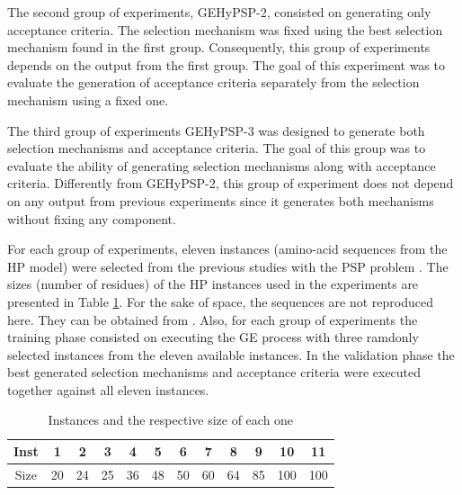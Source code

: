 \documentclass[conference]{IEEEtran}
\begin{document}
The second group of experiments, GEHyPSP-2, consisted on  generating only acceptance criteria. The selection mechanism was fixed using the best selection mechanism found in the first group. Consequently, this group of experiments depends on the output from the first group. The goal of this experiment was to evaluate the generation of acceptance criteria separately from the selection mechanism using a fixed one.



The third group of experiments GEHyPSP-3 was designed to  generate both selection mechanisms and acceptance criteria. The goal of this group was to evaluate the ability of generating selection mechanisms along with acceptance criteria. Differently from GEHyPSP-2, this group of experiment does not depend on any output from previous experiments since it generates both mechanisms without fixing any component.



For each group of experiments, eleven instances (amino-acid sequences from the HP model) were selected from the previous studies with the PSP problem \cite{custodio2004investigation,lin2011protein,santana2008component,custodio2014multiple}. The sizes (number of residues) of the HP instances used in the experiments are presented in Table \ref{tab:instances}. 
 For the sake of space, the sequences are not reproduced here. They can be obtained from \cite{santana2008component}. Also, for each group of experiments the training phase consisted on executing the GE process with three ramdonly selected instances from the eleven available instances. In the validation phase the best generated selection mechanisms and acceptance criteria were executed together against all eleven instances. 

\begin{table}[]
	\centering
	\caption{Instances and the respective size of each one}
	\label{tab:instances}
	\begin{tabular}{cccccccccccc}
		Inst & 1 & 2 & 3 & 4 & 5 & 6 & 7 & 8 & 9 & 10 & 11 \\ \hline
		Size & 20 & 24 & 25 & 36 & 48 & 50 & 60 & 64 & 85 & 100 & 100 \\ \hline
	\end{tabular}
\end{table}
\end{document}
